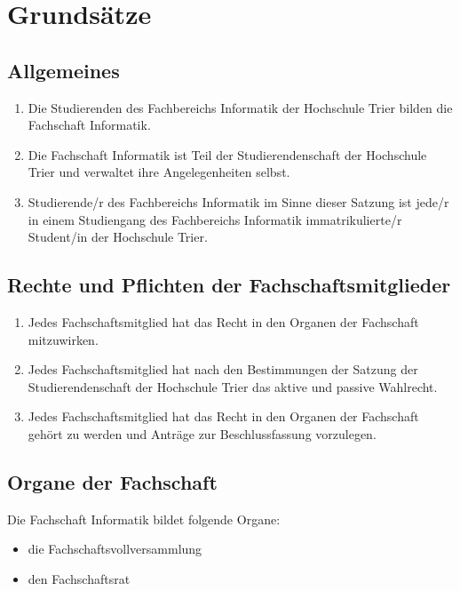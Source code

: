 \section{Grundsätze}

\subsection{Allgemeines}
\begin{enumerate}
\item Die Studierenden des Fachbereichs Informatik der Hochschule Trier bilden die Fachschaft Informatik.
\item Die Fachschaft Informatik ist Teil der Studierendenschaft der Hochschule Trier und verwaltet ihre Angelegenheiten selbst.
\item Studierende/r des Fachbereichs Informatik im Sinne dieser Satzung ist jede/r in einem Studiengang des Fachbereichs Informatik immatrikulierte/r Student/in der Hochschule Trier.
\end{enumerate}

\subsection{Rechte und Pflichten der Fachschaftsmitglieder}
\begin{enumerate}
\item Jedes Fachschaftsmitglied hat das Recht in den Organen der Fachschaft mitzuwirken.
\item Jedes Fachschaftsmitglied hat nach den Bestimmungen der Satzung der Studierendenschaft der Hochschule Trier das aktive und passive Wahlrecht.
\item Jedes Fachschaftsmitglied hat das Recht in den Organen der Fachschaft gehört zu werden und Anträge zur Beschlussfassung vorzulegen.
\end{enumerate}

\subsection{Organe der Fachschaft}
Die Fachschaft Informatik bildet folgende Organe:
\begin{itemize}
\item die Fachschaftsvollversammlung
\item den Fachschaftsrat
\end{itemize}
